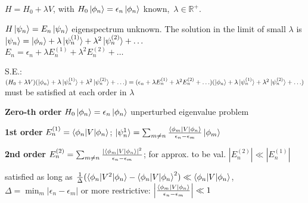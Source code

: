 \begin{squishlist}
    \item $H = H_0 + \lambda V$, with $H_0 \ket{\phi_n} = \epsilon_n \ket{\phi_n}$ known,\, $\lambda \in \mathbb{R}^+$. 
    \item $H \ket{\psi_n} = E_n \ket{\psi_n}$ eigenspectrum unknown. The solution in the limit of small $\lambda$ is 
    $\ket{\psi_n} = \ket{\phi_n} + \lambda \ket{\psi_n^{(1)}} + \lambda^2 \ket{\psi_n^{(2)}} + \ldots$ \\
    $E_n = \epsilon_n + \lambda E_n^{(1)} + \lambda^2 E_n^{(2)} + \ldots$
    \item S.E.: $(H_0 + \lambda V)(\ket{\phi_n} + \lambda \ket{\psi_n^{(1)}} + \lambda^2 \ket{\psi_n^{(2)}} + \ldots) = (\epsilon_n + \lambda E_n^{(1)} + \lambda^2 E_n^{(2)} + \ldots)(\ket{\phi_n} + \lambda \ket{\psi_n^{(1)}} + \lambda^2 \ket{\psi_n^{(2)}} + \ldots)$ must be satisfied at each order in $\lambda$
\end{squishlist}
\begin{squishlist}
    \item \textbf{Zero-th order} $H_0 \ket{\phi_n} = \epsilon_n \ket{\phi_n}$ unperturbed eigenvalue problem
    \item \textbf{1st order} $E_n^{(1)} = \braket{\phi_n|V|\phi_n}$; \quad $\ket{\psi_n^{1}} = \sum_{m\neq n}\frac{\braket{\phi_m |V |\phi_n}}{\epsilon_n - \epsilon_m} \ket{\phi_m}$
    \item \textbf{2nd order} $E_n^{(2)} = \sum_{m\neq n}\frac{|\braket{\phi_m|V|\phi_n}|^2}{\epsilon_n - \epsilon_m}$; for approx. to be val.  $|E_n^{(2)}| \ll |E_n^{(1)}|$ 
    \item satisfied as long as $\frac{1}{\Delta} ( \braket{\phi_n | V^2|\phi_n} - \braket{\phi_n | V| \phi_n}^2) \ll \braket{\phi_n | V | \phi_n}$, \\ 
    $\Delta = \min_m | \epsilon_n - \epsilon_m|$ or more restrictive: $\left|\frac{\braket{\phi_m | V | \phi_n}}{\epsilon_n - \epsilon_m}\right| \ll 1$
\end{squishlist}

